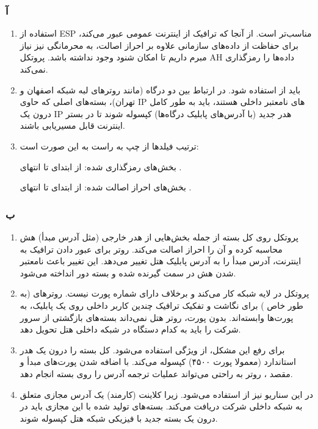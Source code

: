 
\subsubsection*{آ}
\begin{enumerate}
    \item  استفاده از {ESP} مناسب‌تر است. از آنجا که ترافیک از اینترنت عمومی عبور می‌کند، برای حفاظت از داده‌های سازمانی علاوه بر احراز اصالت، به {محرمانگی} نیز نیاز مبرم داریم تا امکان شنود وجود نداشته باشد. پروتکل AH داده‌ها را رمزگذاری نمی‌کند.
    \item  باید از {} استفاده شود. در ارتباط بین دو درگاه  (مانند روترهای لبه شبکه اصفهان و تهران)، بسته‌های اصلی که حاوی IP های نامعتبر داخلی هستند، باید به طور کامل درون یک IP هدر جدید (با آدرس‌های پابلیک درگاه‌ها) کپسوله شوند تا در بستر اینترنت قابل مسیریابی باشند.
    \item 
    ترتیب فیلدها از چپ به راست به این صورت است:

    
    {بخش‌های رمزگذاری شده:} از ابتدای \lr{[Orig IP]} تا انتهای .

    {بخش‌های احراز اصالت شده:} از ابتدای  تا انتهای .
\end{enumerate}

\subsubsection*{ب}
\begin{enumerate}
    \item  پروتکل  روی کل بسته از جمله بخش‌هایی از  هدر خارجی (مثل آدرس  مبدأ) هش محاسبه کرده و آن را احراز اصالت می‌کند. روتر  برای عبور دادن ترافیک به اینترنت، آدرس  مبدأ را به آدرس پابلیک هتل تغییر می‌دهد. این تغییر باعث نامعتبر شدن هش  در سمت گیرنده شده و بسته دور انداخته می‌شود.
    \item  پروتکل  در لایه شبکه کار می‌کند و برخلاف  دارای شماره پورت نیست. روترهای  (به طور خاص  ) برای نگاشت و تفکیک ترافیک چندین کاربر داخلی روی یک  پابلیک، به پورت‌ها وابسته‌اند. بدون پورت، روتر هتل نمی‌داند بسته‌های بازگشتی از سرور شرکت را باید به کدام دستگاه در شبکه داخلی هتل تحویل دهد.
    \item  برای رفع این مشکل، از ویژگی  استفاده می‌شود.  کل بسته  را درون یک هدر استاندارد  (معمولا پورت ۴۵۰۰) کپسوله می‌کند. با اضافه شدن پورت‌های مبدأ و مقصد ، روتر  به راحتی می‌تواند عملیات ترجمه آدرس را روی بسته انجام دهد.
    \item  در این سناریو نیز از {} استفاده می‌شود. زیرا کلاینت (کارمند) یک آدرس  مجازی متعلق به شبکه داخلی شرکت دریافت می‌کند. بسته‌های تولید شده با این  مجازی باید در  درون یک بسته جدید با  فیزیکی شبکه هتل کپسوله شوند.
\end{enumerate}

